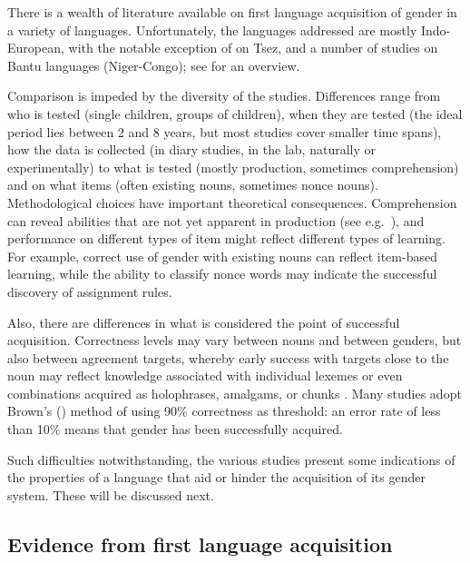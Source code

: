 \documentclass[output=collectionpaper]{langsci/langscibook}
\begin{document}
There is a wealth of literature available on first language acquisition of gender in a variety of languages. Unfortunately, the languages addressed are mostly Indo-European, with the notable exception of \citet{Gagliardi2014} on Tsez, and a number of studies on Bantu languages (Niger-Congo); see \citet{Demuth2003} for an overview.

Comparison is impeded by the diversity of the studies. Differences range from who is tested (single children, groups of children), when they are tested (the ideal period lies between 2 and 8 years, but most studies cover smaller time spans), how the data is collected (in diary studies, in the lab, naturally or experimentally) to what is tested (mostly production, sometimes comprehension) and on what items (often existing nouns, sometimes nonce nouns). Methodological choices have important theoretical consequences. Comprehension can reveal abilities that are not yet apparent in production (see e.g.\ \citealt{Heugten2010}), and performance on different types of item might reflect different types of learning. For example, correct use of gender with existing nouns can reflect item-based learning, while the ability to classify nonce words may indicate the successful discovery of assignment rules.

Also, there are differences in what is considered the point of successful acquisition. Correctness levels may vary between nouns and between genders, but also between agreement targets, whereby early success with targets close to the noun may reflect knowledge associated with individual lexemes or even combinations acquired as holophrases, amalgams, or chunks \citep[59--60]{MacWhinney1978}. Many studies adopt Brown's (\citealt*{Brown1973}) method of using 90\% correctness as threshold: an error rate of less than 10\% means that gender has been successfully acquired.

Such difficulties notwithstanding, the various studies present some indications of the properties of a language that aid or hinder the acquisition of its gender system. These will be discussed next.

\subsection{Evidence from first language acquisition}
\label{sec:Audr:4.2}
\end{document}
